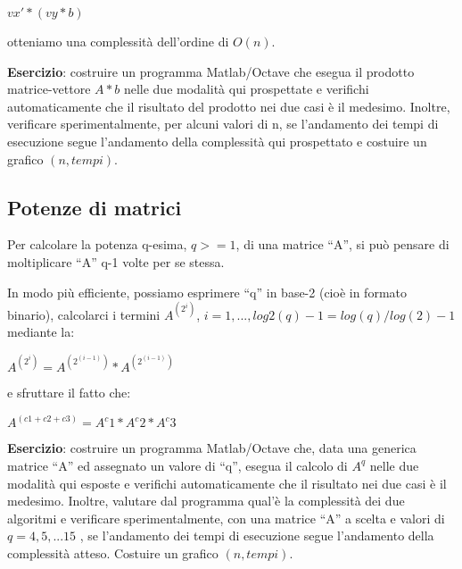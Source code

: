 \begin{center}
$vx' * (vy * b)$
\end{center}

otteniamo una complessità dell'ordine di $O(n)$.

\textbf{Esercizio}: costruire un programma Matlab/Octave che esegua il prodotto matrice-vettore $A*b$ nelle due modalità qui prospettate e verifichi automaticamente che il risultato del prodotto nei due casi è il medesimo. Inoltre, verificare sperimentalmente, per alcuni valori di n, se l'andamento dei tempi di esecuzione segue l'andamento della complessità qui prospettato e costuire un grafico $(n, tempi)$.



\subsection{Potenze di matrici}

Per calcolare la potenza q-esima, $q>=1$, di una matrice ``A'', si può pensare di moltiplicare ``A'' q-1 volte per se stessa.

In modo più efficiente, possiamo esprimere ``q'' in base-2 (cioè in formato binario), calcolarci i termini $A^(2^i)$,  $i =  1,...,log2(q)-1 = log(q)/log(2)-1$ mediante la:

\begin{center}

$A^(2^i)  =  A^(2^(i-1))  *  A^(2^(i-1))$

\end{center}

e sfruttare il fatto che:

\begin{center}
$A^(c1 + c2 + c3)  =  A^c1  *  A^c2  *  A^c3$
\end{center}

\textbf{Esercizio}:  costruire un programma Matlab/Octave che, data una generica matrice ``A'' ed assegnato un valore di ``q'', esegua il calcolo di $A^q$  nelle due modalità qui esposte e verifichi automaticamente che il risultato nei due casi è il medesimo. Inoltre, valutare dal programma qual'è la complessità dei due algoritmi e verificare sperimentalmente, con una matrice ``A'' a scelta e valori di $q = 4,5,...15$ ,  se l'andamento dei tempi di esecuzione segue l'andamento della complessità atteso. Costuire un grafico $(n, tempi)$.

